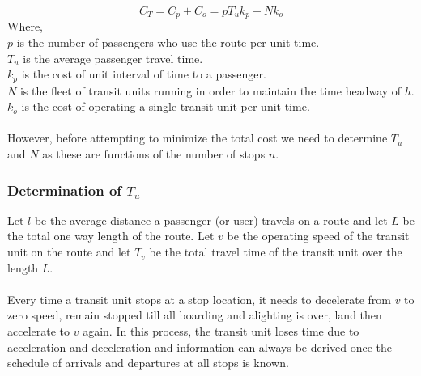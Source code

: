 \begin{equation}
	C_T = C_p + C_o = pT_uk_p + Nk_o
\end{equation}
Where,\\
\hspace*{10mm} $p$ is the number of passengers who use the route per unit time.\\
\hspace*{10mm} $T_u$ is the average passenger travel time.\\
\hspace*{10mm} $k_p$ is the cost of unit interval of time to a passenger.\\
\hspace*{10mm} $N$ is the fleet of transit units running in order to maintain the time headway of $h$.\\
\hspace*{10mm} $k_o$ is the cost of operating a single transit unit per unit time.\\\\
However, before attempting to minimize the total cost we need to determine $T_u$ and $N$ as these are functions of the number of stops $n$.
\subsubsection{Determination of $T_u$}
Let $l$ be the average distance a passenger (or user) travels on a route and let $L$ be the total one way length of the route. Let $v$ be the operating speed of the transit unit on the route and let $T_v$ be the total travel time of the transit unit over the length $L$.\\\\
Every time a transit unit stops at a stop location, it needs to decelerate from $v$ to zero speed, remain stopped till all boarding and alighting is over, land then accelerate to $v$ again. In this process, the transit unit loses time due to acceleration and deceleration and information can always be derived once the schedule of arrivals and departures at all stops is known. 
